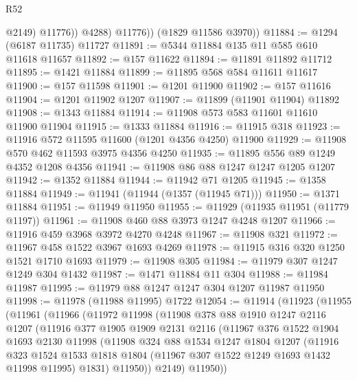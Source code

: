 \begin{lexlean}{R52}
\begin{coremodule}
                  @2149)
                @11776))
            @4288)
          @11776))
      (@1829 @11586 @3970))
@11884 := @1294 (@6187 @11735) @11727
@11891 := @5344 @11884 @135 @11 @585 @610 @11618 @11657
@11892 := @157 @11622
@11894 := @11891 @11892 @11712
@11895 := @1421 @11884
@11899 := @11895 @568 @584 @11611 @11617
@11900 := @157 @11598
@11901 := @1201 @11900
@11902 := @157 @11616
@11904 := @1201 @11902 @1207
@11907 := @11899 (@11901 @11904) @11892
@11908 := @1343 @11884
@11914 := @11908 @573 @583 @11601 @11610 @11900 @11904
@11915 := @1333 @11884
@11916 := @11915 @318
@11923 := @11916 @572 @11595 @11600 (@1201 @4356 @4250) @11900
@11929 := @11908 @570 @462 @11593 @3975 @4356 @4250
@11935 := @11895 @556 @89 @1249 @4352 @1208 @4356
@11941 := @11908 @86 @88 @1247 @1247 @1205 @1207
@11942 := @1352 @11884
@11944 := @11942 @71 @1205
@11945 := @1358 @11884
@11949 := @11941 (@11944 (@1357 (@11945 @71)))
@11950 := @1371 @11884
@11951 := @11949 @11950
@11955 := @11929 (@11935 @11951 (@11779 @1197))
@11961 := @11908 @460 @88 @3973 @1247 @4248 @1207
@11966 := @11916 @459 @3968 @3972 @4270 @4248
@11967 := @11908 @321
@11972 := @11967 @458 @1522 @3967 @1693 @4269
@11978 := @11915 @316 @320 @1250 @1521 @1710 @1693
@11979 := @11908 @305
@11984 := @11979 @307 @1247 @1249 @304 @1432
@11987 := @1471 @11884 @11 @304
@11988 := @11984 @11987
@11995 := @11979 @88 @1247 @1247 @304 @1207 @11987 @11950
@11998 := @11978 (@11988 @11995) @1722
@12054 := @11914
    (@11923
      (@11955
        (@11961
          (@11966
            (@11972
              @11998
              (@11908
                @378
                @88
                @1910
                @1247
                @2116
                @1207
                (@11916
                  @377
                  @1905
                  @1909
                  @2131
                  @2116
                  (@11967
                    @376
                    @1522
                    @1904
                    @1693
                    @2130
                    @11998
                    (@11908
                      @324
                      @88
                      @1534
                      @1247
                      @1804
                      @1207
                      (@11916
                        @323
                        @1524
                        @1533
                        @1818
                        @1804
                        (@11967 @307 @1522 @1249 @1693 @1432 @11998 @11995)
                        @1831)
                      @11950))
                  @2149)
                @11950))

\end{coremodule}
\end{lexlean}
